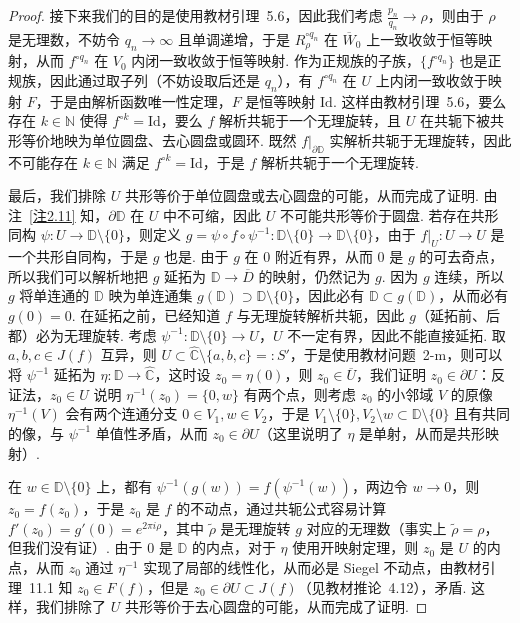 \documentclass[11pt, a4paper, oneside]{ctexart}
\newcommand{\C}{\mathbb{C}}
\newcommand{\D}{\mathbb{D}}
\newcommand{\N}{\mathbb{N}}
\newcommand{\Id}{\mathrm{Id}}
\begin{document}
\begin{proof}
        接下来我们的目的是使用教材引理~5.6，因此我们考虑 $\frac{p_n}{q_n}\to\rho$，则由于 $\rho$ 是无理数，不妨令 $q_n\to\infty$ 且单调递增，于是 $R_{\rho}^{\circ q_n}$ 在 $\overline{W}_0$ 上一致收敛于恒等映射，从而 $f^{\circ q_n}$ 在 $V_0$ 内闭一致收敛于恒等映射. 作为正规族的子族，$\{f^{\circ q_n}\}$ 也是正规族，因此通过取子列（不妨设取后还是 $q_n$），有 $f^{\circ q_n}$ 在 $U$ 上内闭一致收敛于映射 $F$，于是由解析函数唯一性定理，$F$ 是恒等映射 $\Id$. 这样由教材引理~5.6，要么存在 $k\in\N$ 使得 $f^{\circ k}=\Id$，要么 $f$ 解析共轭于一个无理旋转，且 $U$ 在共轭下被共形等价地映为单位圆盘、去心圆盘或圆环. 既然 $f|_{\partial \D}$ 实解析共轭于无理旋转，因此不可能存在 $k\in\N$ 满足 $f^{\circ k}=\Id$，于是 $f$ 解析共轭于一个无理旋转.

        最后，我们排除 $U$ 共形等价于单位圆盘或去心圆盘的可能，从而完成了证明. 由注~\ref{注2.11} 知，$\partial\D$ 在 $U$ 中不可缩，因此 $U$ 不可能共形等价于圆盘. 若存在共形同构 $\psi:U\to \D\setminus\{0\}$，则定义 $g=\psi\circ f\circ \psi^{-1}:\D\setminus\{0\}\to \D\setminus\{0\}$，由于 $f|_U:U\to U$ 是一个共形自同构，于是 $g$ 也是. 由于 $g$ 在 $0$ 附近有界，从而 $0$ 是 $g$ 的可去奇点，所以我们可以解析地把 $g$ 延拓为 $\D\to \overline{D}$ 的映射，仍然记为 $g$. 因为 $g$ 连续，所以 $g$ 将单连通的 $\D$ 映为单连通集 $g(\D)\supset \D\setminus\{0\}$，因此必有 $\D\subset g(\D)$，从而必有 $g(0)=0$. 在延拓之前，已经知道 $f$ 与无理旋转解析共轭，因此 $g$（延拓前、后都）必为无理旋转. 考虑 $\psi^{-1}:\D\setminus\{0\}\to U$，$U$ 不一定有界，因此不能直接延拓. 取 $a,b,c\in J(f)$ 互异，则 $U\subset \hat{\C}\setminus\{a,b,c\}=:S'$，于是使用教材问题~2-m，则可以将 $\psi^{-1}$ 延拓为 $\eta:\D\to\hat{\C}$，这时设 $z_0=\eta(0)$，则 $z_0\in \overline{U}$，我们证明 $z_0\in \partial U$：反证法，$z_0\in U$ 说明 $\eta^{-1}(z_0)=\{0,w\}$ 有两个点，则考虑 $z_0$ 的小邻域 $V$ 的原像 $\eta^{-1}(V)$ 会有两个连通分支 $0\in V_1,w\in V_2$，于是 $V_1\setminus \{0\},V_2\setminus w\subset \D\setminus\{0\}$ 且有共同的像，与 $\psi^{-1}$ 单值性矛盾，从而 $z_0\in \partial U$（这里说明了 $\eta$ 是单射，从而是共形映射）.

        在 $w\in \D\setminus\{0\}$ 上，都有 $\psi^{-1}(g(w))=f(\psi^{-1}(w))$，两边令 $w\to 0$，则 $z_0=f(z_0)$，于是 $z_0$ 是 $f$ 的不动点，通过共轭公式容易计算 $f'(z_0)=g'(0)=e^{2\pi i\rho}$，其中 $\tilde{\rho}$ 是无理旋转 $g$ 对应的无理数（事实上 $\tilde{\rho}=\rho$，但我们没有证）. 由于 $0$ 是 $\D$ 的内点，对于 $\eta$ 使用开映射定理，则 $z_0$ 是 $U$ 的内点，从而 $z_0$ 通过 $\eta^{-1}$ 实现了局部的线性化，从而必是 Siegel 不动点，由教材引理~11.1 知 $z_0\in F(f)$，但是 $z_0\in \partial U\subset J(f)$（见教材推论~4.12），矛盾. 这样，我们排除了 $U$ 共形等价于去心圆盘的可能，从而完成了证明.
    \end{proof}
\end{document}
